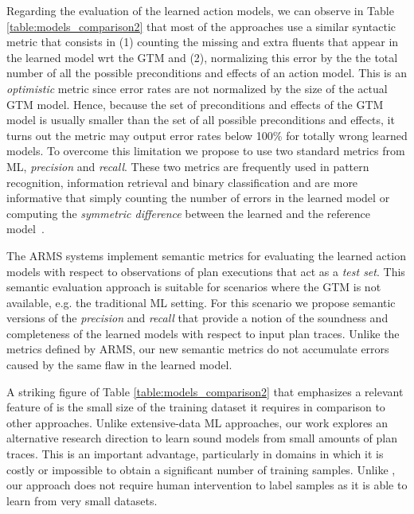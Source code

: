 Regarding the evaluation of the learned action models, we can observe in Table \ref{table:models_comparison2} that most of the approaches use a similar syntactic metric that consists in (1) counting the missing and extra fluents that appear in the learned model wrt the GTM and (2), normalizing this error by the the total number of all the possible preconditions and effects of an action model. This is an \emph{optimistic} metric since error rates are not normalized by the size of the actual GTM model. Hence, because the set of preconditions and effects of the GTM model is usually smaller than the set of all possible preconditions and effects, it turns out the metric may output error rates below 100\% for totally wrong learned models. To overcome this limitation we propose to use two standard metrics from ML, {\em precision} and {\em recall}. These two metrics are frequently used in pattern recognition, information retrieval and binary classification and are more informative that simply counting the number of errors in the learned model or computing the {\em symmetric difference} between the learned and the reference model~\cite{davis2006relationship}.

The ARMS systems implement semantic metrics for evaluating the learned action models with respect to observations of plan executions that act as a {\em test set}. This semantic evaluation approach is suitable for scenarios where the GTM is not available, e.g. the traditional ML setting. For this scenario we propose semantic versions of the {\em precision} and {\em recall} that provide a notion of the soundness and completeness of the learned models with respect to input plan traces. Unlike the metrics defined by ARMS, our new semantic metrics do not accumulate errors caused by the same flaw in the learned model. 

A striking figure of Table \ref{table:models_comparison2} that emphasizes a relevant feature of \FAMA is the small size of the training dataset it requires in comparison to other approaches. Unlike extensive-data ML approaches, our work explores an alternative research direction to learn sound models from small amounts of plan traces. This is an important advantage, particularly in domains in which it is costly or impossible to obtain a significant number of training samples. Unlike \CAMA, our approach does not require human intervention to label samples as it is able to learn from very small datasets.

